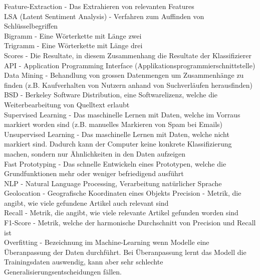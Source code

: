 Feature-Extraction - Das Extrahieren von relevanten Features\\
LSA (Latent Sentiment Analysis) - Verfahren zum Auffinden von Schlüsselbegriffen\\
Bigramm - Eine Wörterkette mit Länge zwei\\
Trigramm - Eine Wörterkette mit Länge drei\\
Scores - Die Resultate, in diesem Zusammenhang die Resultate der Klassifizierer\\
API - Application Programming Interface (Applikationsprogrammierschnittstelle)\\
Data Mining - Behandlung von grossen Datenmengen um Zusammenhänge zu finden (z.B. Kaufverhalten von Nutzern anhand von Suchverläufen herausfinden)\\
BSD - Berkeley Software Distribution, eine Softwarelizenz, welche die Weiterbearbeitung von Quelltext erlaubt\\
Supervised Learning - Das maschinelle Lernen mit Daten, welche im Vorraus markiert worden sind (z.B. manuelles Markieren von Spam bei Emails)\\
Unsupervised Learning - Das maschinelle Lernen mit Daten, welche nicht markiert sind. Dadurch kann der Computer keine konkrete Klassifizierung machen, sondern nur Ähnlichkeiten in den Daten aufzeigen\\
Fast Prototyping - Das schnelle Entwickeln eines Prototypen, welche die Grundfunktionen mehr oder weniger befriedigend ausführt\\
NLP - Natural Language Processing, Verarbeitung natürlicher Sprache\\
Geolocation - Geografische Koordinaten eines Objekts
Precision - Metrik, die angibt, wie viele gefundene Artikel auch relevant sind\\
Recall - Metrik, die angibt, wie viele relevante Artikel gefunden worden sind\\
F1-Score - Metrik, welche der harmonische Durchschnitt von Precision und Recall ist\\
Overfitting - Bezeichnung im Machine-Learning wenn Modelle eine Überanpassung der Daten durchführt. Bei Überanpassung lernt das Modell die Trainingsdaten auswendig, kann aber sehr schlechte Generalisierungsentscheidungen fällen.\\
